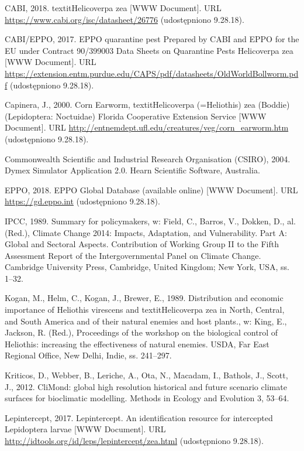 \documentclass[polish,a4paper]{article}
\begin{document}
\hypertarget{ref-cabi2017}{}
CABI, 2018. textitHelicoverpa zea {[}WWW Document{]}. URL
\url{https://www.cabi.org/isc/datasheet/26776} (udostępniono 9.28.18).

\hypertarget{ref-cabieppo2017}{}
CABI/EPPO, 2017. EPPO quarantine pest Prepared by CABI and EPPO for the
EU under Contract 90/399003 Data Sheets on Quarantine Pests Helicoverpa
zea {[}WWW Document{]}. URL
\url{https://extension.entm.purdue.edu/CAPS/pdf/datasheets/OldWorldBollworm.pdf}
(udostępniono 9.28.18).

\hypertarget{ref-capinera2000}{}
Capinera, J., 2000. Corn Earworm, textitHelicoverpa (=Heliothis) zea
(Boddie) (Lepidoptera: Noctuidae) Florida Cooperative Extension Service
{[}WWW Document{]}. URL
\url{http://entnemdept.ufl.edu/creatures/veg/corn_earworm.htm}
(udostępniono 9.28.18).

\hypertarget{ref-csiro2004}{}
Commonwealth Scientific and Industrial Research Organisation (CSIRO),
2004. Dymex Simulator Application 2.0. Hearn Scientific Software,
Australia.

\hypertarget{ref-eppo2018}{}
EPPO, 2018. EPPO Global Database (available online) {[}WWW Document{]}.
URL \url{https://gd.eppo.int} (udostępniono 9.28.18).

\hypertarget{ref-ipcc2014}{}
IPCC, 1989. Summary for policymakers, w: Field, C., Barros, V., Dokken,
D., al. (Red.), Climate Change 2014: Impacts, Adaptation, and
Vulnerability. Part A: Global and Sectoral Aspects. Contribution of
Working Group II to the Fifth Assessment Report of the Intergovernmental
Panel on Climate Change. Cambridge University Press, Cambridge, United
Kingdom; New York, USA, ss. 1--32.

\hypertarget{ref-kogan1989}{}
Kogan, M., Helm, C., Kogan, J., Brewer, E., 1989. Distribution and
economic importance of Heliothis virescens and textitHelicoverpa zea in
North, Central, and South America and of their natural enemies and host
plants., w: King, E., Jackson, R. (Red.), Proceedings of the workshop on
the biological control of Heliothis: increasing the effectiveness of
natural enemies. USDA, Far East Regional Office, New Delhi, Indie, ss.
241--297.

\hypertarget{ref-kriticos2012}{}
Kriticos, D., Webber, B., Leriche, A., Ota, N., Macadam, I., Bathols,
J., Scott, J., 2012. CliMond: global high resolution historical and
future scenario climate surfaces for bioclimatic modelling. Methods in
Ecology and Evolution 3, 53--64.

\hypertarget{ref-lepintercept2017}{}
Lepintercept, 2017. Lepintercept. An identification resource for
intercepted Lepidoptera larvae {[}WWW Document{]}. URL
\url{http://idtools.org/id/leps/lepintercept/zea.html} (udostępniono
9.28.18).
\end{document}
